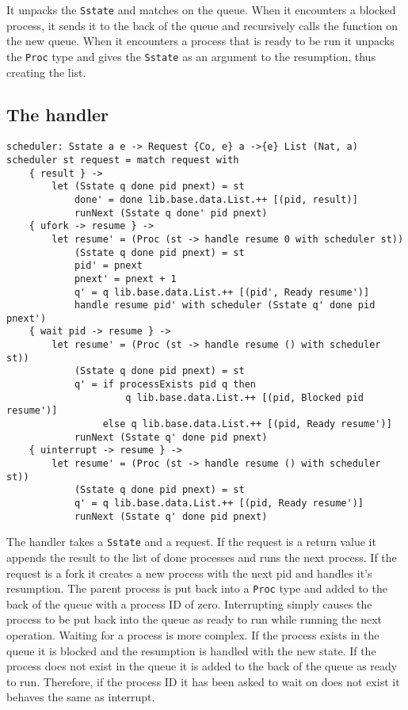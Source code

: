 \documentclass[logo,bsc,singlespacing,parskip]{infthesis}
\begin{document}
It unpacks the \texttt{Sstate} and matches on the queue. When it encounters a
blocked process, it sends it to the back of the queue and recursively calls the
function on the new queue. When it encounters a process that is ready to be run
it unpacks the \texttt{Proc} type and gives the \texttt{Sstate} as an argument
to the resumption, thus creating the list.

\subsection{The handler}

\begin{lstlisting}[language=unison]
scheduler: Sstate a e -> Request {Co, e} a ->{e} List (Nat, a)
scheduler st request = match request with 
    { result } -> 
        let (Sstate q done pid pnext) = st 
            done' = done lib.base.data.List.++ [(pid, result)]
            runNext (Sstate q done' pid pnext)
    { ufork -> resume } -> 
        let resume' = (Proc (st -> handle resume 0 with scheduler st))
            (Sstate q done pid pnext) = st
            pid' = pnext
            pnext' = pnext + 1
            q' = q lib.base.data.List.++ [(pid', Ready resume')]
            handle resume pid' with scheduler (Sstate q' done pid pnext')
    { wait pid -> resume } -> 
        let resume' = (Proc (st -> handle resume () with scheduler st))
            (Sstate q done pid pnext) = st
            q' = if processExists pid q then
                     q lib.base.data.List.++ [(pid, Blocked pid resume')]
                 else q lib.base.data.List.++ [(pid, Ready resume')]
            runNext (Sstate q' done pid pnext)
    { uinterrupt -> resume } -> 
        let resume' = (Proc (st -> handle resume () with scheduler st))
            (Sstate q done pid pnext) = st
            q' = q lib.base.data.List.++ [(pid, Ready resume')]
            runNext (Sstate q' done pid pnext)
\end{lstlisting}

The handler takes a \texttt{Sstate} and a request. If the request is a return
value it appends the result to the list of done processes and runs the next
process. If the request is a fork it creates a new process with the next pid
and handles it's resumption. The parent process is put back into a
\texttt{Proc} type and added to the back of the queue with a process ID of
zero. Interrupting simply causes the process to be put back into the queue as
ready to run while running the next operation. Waiting for a process is more
complex. If the process exists in the queue it is blocked and the resumption is
handled with the new state. If the process does not exist in the queue it is
added to the back of the queue as ready to run. Therefore, if the process ID it
has been asked to wait on does not exist it behaves the same as interrupt.
\end{document}
